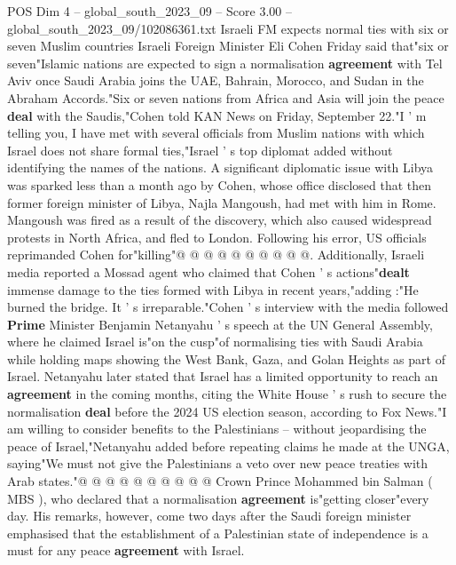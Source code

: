 \begin{textsample}{POS Dim 4 – global\_south\_2023\_09 – Score 3.00 – global\_south\_2023\_09/102086361.txt}  \label{ex:f4_pos_435}
Israeli FM expects normal ties with six or seven Muslim countries Israeli Foreign Minister Eli Cohen Friday said that"six or seven"Islamic nations are expected to sign a normalisation \textbf{agreement} with Tel Aviv once Saudi Arabia joins the UAE, Bahrain, Morocco, and Sudan in the Abraham Accords."Six or seven nations from Africa and Asia will join the peace \textbf{deal} with the Saudis,"Cohen told KAN News on Friday, September 22."I ' m telling you, I have met with several officials from Muslim nations with which Israel does not share formal ties,"Israel ' s top diplomat added without identifying the names of the nations.
A significant diplomatic issue with Libya was sparked less than a month ago by Cohen, whose office disclosed that then former foreign minister of Libya, Najla Mangoush, had met with him in Rome.
Mangoush was fired as a result of the discovery, which also caused widespread protests in North Africa, and fled to London.
Following his error, US officials reprimanded Cohen for"killing"@ @ @ @ @ @ @ @ @ @.
Additionally, Israeli media reported a Mossad agent who claimed that Cohen ' s actions"\textbf{dealt} immense damage to the ties formed with Libya in recent years,"adding :"He burned the bridge.
It ' s irreparable."Cohen ' s interview with the media followed \textbf{Prime} Minister Benjamin Netanyahu ' s speech at the UN General Assembly, where he claimed Israel is"on the cusp"of normalising ties with Saudi Arabia while holding maps showing the West Bank, Gaza, and Golan Heights as part of Israel.
Netanyahu later stated that Israel has a limited opportunity to reach an \textbf{agreement} in the coming months, citing the White House ' s rush to secure the normalisation \textbf{deal} before the 2024 US election season, according to Fox News."I am willing to consider benefits to the Palestinians -- without jeopardising the peace of Israel,"Netanyahu added before repeating claims he made at the UNGA, saying"We must not give the Palestinians a veto over new peace treaties with Arab states."@ @ @ @ @ @ @ @ @ @ Crown Prince Mohammed bin Salman ( MBS ), who declared that a normalisation \textbf{agreement} is"getting closer"every day.
His remarks, however, come two days after the Saudi foreign minister emphasised that the establishment of a Palestinian state of independence is a must for any peace \textbf{agreement} with Israel.

\end{textsample}
